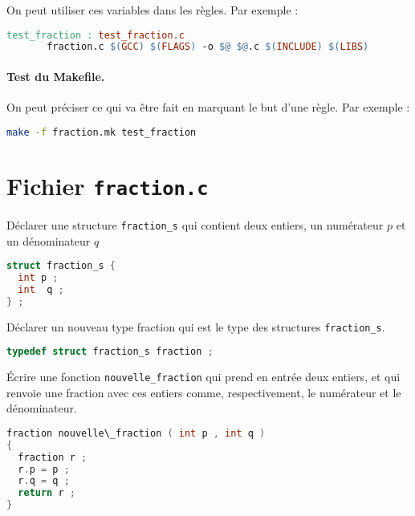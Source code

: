 On peut utiliser ces variables dans les règles. Par exemple :
\begin{lstlisting}[language=make]
test_fraction : test_fraction.c
       fraction.c $(GCC) $(FLAGS) -o $@ $@.c $(INCLUDE) $(LIBS) 
\end{lstlisting}


\paragraph{Test du Makefile.} On peut préciser ce qui va être fait en
marquant le but d’une règle. Par exemple :
\begin{lstlisting}[language=bash]
  make -f fraction.mk test_fraction
\end{lstlisting}

\section{Fichier \texttt{fraction.c}}


\question Déclarer une structure \texttt{fraction\_s} qui contient
deux entiers, un numérateur \(p\) et un dénominateur \(q\)

\begin{solutioncachee}
  \begin{lstlisting}[language=C]
struct fraction_s {
  int p ;
  int  q ;
} ;
  \end{lstlisting}
\end{solutioncachee}

\question Déclarer un nouveau type fraction qui est le type des structures \texttt{fraction\_s}.
\begin{solutioncachee}
  \begin{lstlisting}[language=C]
typedef struct fraction_s fraction ;
\end{lstlisting}
\end{solutioncachee}

\question Écrire une fonction \texttt{nouvelle\_fraction} qui prend en
entrée deux entiers, et qui renvoie une fraction avec ces entiers
comme, respectivement, le numérateur et le dénominateur.  

\begin{solutioncachee}
  \begin{lstlisting}[language=C]
fraction nouvelle\_fraction ( int p , int q )
{
  fraction r ;
  r.p = p ;
  r.q = q ;
  return r ;
}
\end{lstlisting}
\end{solutioncachee}

